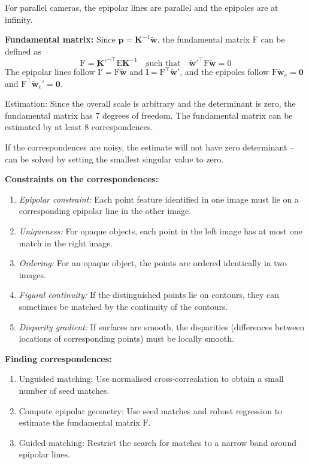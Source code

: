 \documentclass[12pt]{article}
\begin{document}
For parallel cameras, the epipolar lines are parallel and the epipoles are at infinity.

\textbf{Fundamental matrix:} Since $\mathbf{p} = \mathbf{K}^{-1}\tilde{\mathbf{w}}$, the fundamental matrix $\mathrm{F}$ can be defined as
$$
\mathrm{F} = \mathbf{K}'^{-\top} \mathrm{E} \mathbf{K}^{-1} \quad \text{such that} \quad \tilde{\mathbf{w}}'^\top \mathrm{F} \tilde{\mathbf{w}} = 0
$$
The epipolar lines follow $\tilde{\mathbf{l}}' = \mathrm{F} \tilde{\mathbf{w}}$ and $\tilde{\mathbf{l}} = \mathrm{F}^\top \tilde{\mathbf{w}}'$, and the epipoles follow $\mathrm{F} \tilde{\mathbf{w}}_e = \mathbf{0}$ and $\mathrm{F}^\top \tilde{\mathbf{w}}_e' = \mathbf{0}$.

Estimation:
Since the overall scale is arbitrary and the determinant is zero, the fundamental matrix has 7 degrees of freedom. The fundamental matrix can be estimated by at least 8 correspondences. 

If the correspondences are noisy, the estimate will not have zero determinant -- can be solved by setting the smallest singular value to zero.

\textbf{Constraints on the correspondences:}
\begin{enumerate}
    \item \textit{Epipolar constraint:} Each point feature identified in one image must lie on a corresponding epipolar line in the other image.
    \item \textit{Uniqueness:} For opaque objects, each point in the left image has at most one match in the right image.
    \item \textit{Ordering:} For an opaque object, the points are ordered identically in two images.
    \item \textit{Figural continuity:} If the distinguished points lie on contours, they can sometimes be matched by the continuity of the contours.
    \item \textit{Disparity gradient:} If surfaces are smooth, the disparities (differences between locations of corresponding points) must be locally smooth.
\end{enumerate}

\textbf{Finding correspondences:}
\begin{enumerate}
    \item Unguided matching: Use normalised cross-correalation to obtain a small number of seed matches.
    \item Compute epipolar geometry: Use seed matches and robust regression to estimate the fundamental matrix $\mathrm{F}$.
    \item Guided matching: Restrict the search for matches to a narrow band around epipolar lines.
\end{enumerate}
\end{document}
